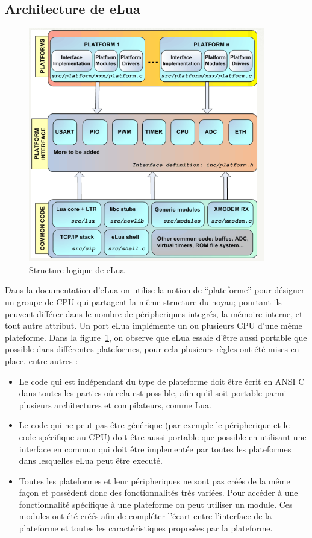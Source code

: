 \subsection{Architecture de eLua}

\begin{figure}[h]
\begin{center}
\includegraphics[scale=0.6]{../images/eLua/schema.png}
\caption{Structure logique de eLua}
\label{elua}
\end{center}
\end{figure}

  Dans la documentation d'eLua on utilise la notion de ``plateforme'' pour désigner un groupe de CPU qui partagent la même structure du noyau; pourtant
ils peuvent différer dans le nombre de péripheriques integrés, la mémoire interne, et tout autre attribut. Un port eLua implémente un ou plusieurs
CPU d'une même plateforme.
Dans la figure~\ref{elua}, on observe que eLua essaie d'être aussi portable que possible dans différentes plateformes, pour cela plusieurs règles ont été mises en
place, entre autres :

\begin{itemize}
 \item Le code qui est indépendant du type de plateforme doit être écrit en ANSI C dans toutes les parties où cela est possible, afin qu'il soit
portable parmi plusieurs architectures et compilateurs, comme Lua.

 \item Le code qui ne peut pas être générique (par exemple le péripherique et le code spécifique au CPU) doit être aussi portable que possible en
utilisant une interface en commun qui doit être implementée par toutes les plateformes dans lesquelles eLua peut être executé.

 \item Toutes les plateformes et leur péripheriques ne sont pas créés de la même façon et possèdent donc des fonctionnalités très variées. Pour accéder
à une fonctionnalité spécifique à une plateforme on peut utiliser un module. Ces modules ont été créés afin de compléter l'écart entre l'interface de
la plateforme et toutes les caractéristiques proposées par la plateforme.

\end{itemize}

